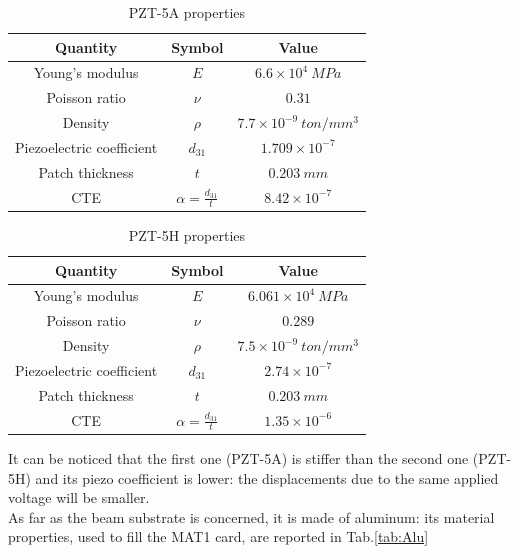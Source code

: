 \documentclass[twocolumn,a4paper,10pt,english]{article}
\def\arraystretch{2.5}
\begin{document}
	    \begin{table}[H]
	    	\footnotesize
	    	\def\arraystretch{1.2}
	    	\centering
	    	\begin{tabular}{|c|c|c|}
	    		\hline
	    		\textbf{Quantity} & \textbf{Symbol} & \textbf{Value} \\
	    		\hline
	    		Young's modulus & $E$ & $6.6\times10^4~MPa$  \\
	    		\hline
	    		Poisson ratio & $\nu$ & $0.31$ \\ 
	    		\hline
	    		Density &$\rho$ & $7.7\times10^{-9}~ton/mm^3$ \\
	    		\hline
	    		Piezoelectric coefficient & $d_{31}$ & $1.709\times10^{-7}$ \\
	    		\hline
	    		Patch thickness & $t$ & $0.203~mm$ \\
	    		\hline
	    		CTE & $\alpha=\frac{d_{31}}{t}$ & $8.42\times10^{-7}$ \\
	    		\hline
	    	\end{tabular}
	    	\caption{PZT-5A properties}
	    	\label{tab:5A}
	    \end{table}
		\begin{table}[H]
			\footnotesize
			\def\arraystretch{1.2}
			\centering
			\begin{tabular}{|c|c|c|}
				\hline
				\textbf{Quantity} & \textbf{Symbol} & \textbf{Value} \\
				\hline
				Young's modulus & $E$ & $6.061\times10^4~MPa$  \\
				\hline
				Poisson ratio & $\nu$ & $0.289$ \\ 
				\hline
				Density &$\rho$ & $7.5\times10^{-9}~ton/mm^3$ \\
				\hline
				Piezoelectric coefficient & $d_{31}$ & $2.74\times10^{-7}$ \\
				\hline
				Patch thickness & $t$ & $0.203~mm$ \\
				\hline
				CTE & $\alpha=\frac{d_{31}}{t}$ & $1.35\times10^{-6}$ \\
				\hline
			\end{tabular}
			\caption{PZT-5H properties}
			\label{tab:5H}
		\end{table}
		It can be noticed that the first one (PZT-5A) is stiffer than the second one (PZT-5H) and its piezo coefficient is lower: the displacements due to the same applied voltage will be smaller. \\
	    As far as the beam substrate is concerned, it is made of aluminum: its material properties, used to fill the MAT1 card, are reported in Tab.\ref{tab:Alu} 
\end{document}
